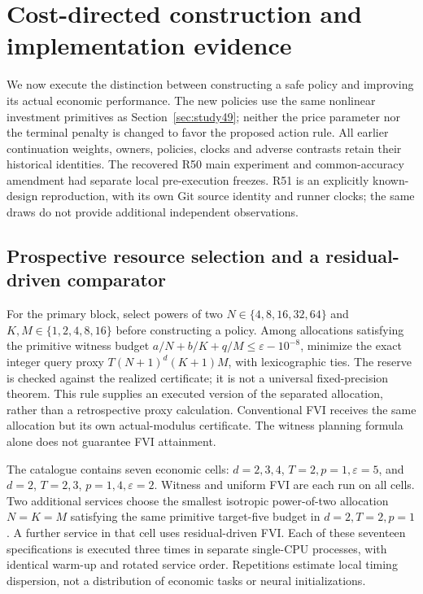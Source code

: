 \section{Cost-directed construction and implementation evidence}\label{sec:study50}
We now execute the distinction between constructing a safe policy and improving its actual economic performance. The new policies use the same nonlinear investment primitives as Section~\ref{sec:study49}; neither the price parameter nor the terminal penalty is changed to favor the proposed action rule. All earlier continuation weights, owners, policies, clocks and adverse contrasts retain their historical identities. The recovered R50 main experiment and common-accuracy amendment had separate local pre-execution freezes. R51 is an explicitly known-design reproduction, with its own Git source identity and runner clocks; the same draws do not provide additional independent observations.

\subsection{Prospective resource selection and a residual-driven comparator}
For the primary block, select powers of two $N\in\{4,8,16,32,64\}$ and $K,M\in\{1,2,4,8,16\}$ before constructing a policy. Among allocations satisfying the primitive witness budget $a/N+b/K+q/M\le\varepsilon-10^{-8}$, minimize the exact integer query proxy $T(N+1)^d(K+1)M$, with lexicographic ties. The reserve is checked against the realized certificate; it is not a universal fixed-precision theorem. This rule supplies an executed version of the separated allocation, rather than a retrospective proxy calculation. Conventional FVI receives the same allocation but its own actual-modulus certificate. The witness planning formula alone does not guarantee FVI attainment.

The catalogue contains seven economic cells: $d=2,3,4$, $T=2,p=1,\varepsilon=5$, and $d=2$, $T=2,3$, $p=1,4,\varepsilon=2$. Witness and uniform FVI are each run on all cells. Two additional services choose the smallest isotropic power-of-two allocation $N=K=M$ satisfying the same primitive target-five budget in $d=2,T=2,p=1$. A further service in that cell uses residual-driven FVI. Each of these seventeen specifications is executed three times in separate single-CPU processes, with identical warm-up and rotated service order. Repetitions estimate local timing dispersion, not a distribution of economic tasks or neural initializations.

